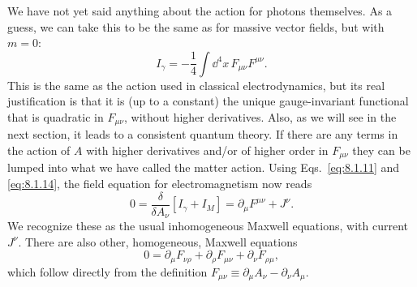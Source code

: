 We have not yet said anything about the action for photons themselves.
As a guess, we can take this to be the same as for massive vector fields,
but with $m=0$:
\begin{equation}
  I_\gamma=-\frac14\int \dd^4x\,F_{\mu\nu}F^{\mu\nu}.
  \tag{8.1.14}\label{eq:8.1.14}
\end{equation}
This is the same as the action used in classical electrodynamics, but its
real justification is that it is (up to a constant) the unique gauge-invariant
functional that is quadratic in $F_{\mu\nu}$, without higher derivatives. Also,
as we will see in the next section, it leads to a consistent quantum theory.
If there are any terms in the action of $A$ with higher derivatives and/or
of higher order in $F_{\mu\nu}$ they can be lumped into what we have called
the matter action. Using Eqs.~\eqref{eq:8.1.11} and \eqref{eq:8.1.14}, the field equation for
electromagnetism now reads
\begin{equation}
  0=\frac{\delta}{\delta A_\nu}[I_\gamma+I_M]
  =\partial_\mu F^{\mu\nu}+J^\nu.
  \tag{8.1.15}\label{eq:8.1.15}
\end{equation}
We recognize these as the usual inhomogeneous Maxwell equations, with
current $J^\nu$. There are also other, homogeneous, Maxwell equations
\begin{equation}
  0=\partial_\mu F_{\nu\rho}+\partial_\rho F_{\mu\nu}
  +\partial_\nu F_{\rho\mu},
  \tag{8.1.16}\label{eq:8.1.16}
\end{equation}
which follow directly from the definition
$F_{\mu\nu}\equiv\partial_\mu A_\nu-\partial_\nu A_\mu$.

